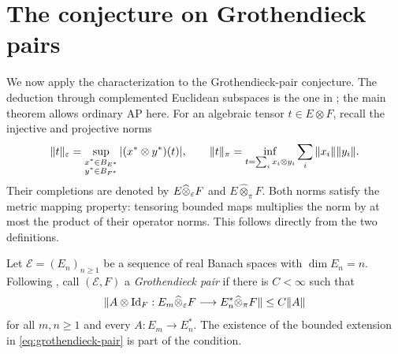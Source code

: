 \section{The conjecture on Grothendieck pairs}\label{sec:grothendieck}

We now apply the characterization to the Grothendieck-pair conjecture.
The deduction through complemented Euclidean subspaces is the one in
\cite[Corollary 4.8]{GMR25}; the main theorem allows ordinary AP here.
For an algebraic tensor \(t\in E\otimes F\), recall the injective
and projective norms
\[
\|t\|_\varepsilon
=\sup_{\substack{x^*\in B_{E^*}\\y^*\in B_{F^*}}}
  |(x^*\otimes y^*)(t)|,\qquad
\|t\|_\pi
=\inf_{t=\sum_i x_i\otimes y_i}\sum_i\|x_i\|\|y_i\|.
\]
Their completions are denoted by
\(E\widehat\otimes_\varepsilon F\) and \(E\widehat\otimes_\pi F\).
Both norms satisfy the metric mapping property:
tensoring bounded maps multiplies the norm by at most the product
of their operator norms. This follows directly from the two
definitions.

Let \(\mathcal E=(E_n)_{n\ge1}\) be a sequence of real Banach spaces
with \(\dim E_n=n\).
Following \cite[Definition 1.2]{GMR25}, call \((\mathcal E,F)\)
a \emph{Grothendieck pair} if there is \(C<\infty\) such that
\begin{equation}\label{eq:grothendieck-pair}
\|A\otimes\mathrm{Id}_F:
E_m\widehat\otimes_\varepsilon F
\longrightarrow E_n^*\widehat\otimes_\pi F\|
\le C\|A\|
\end{equation}
for all \(m,n\ge1\) and every \(A:E_m\to E_n^*\).
The existence of the bounded extension in
\eqref{eq:grothendieck-pair} is part of the condition.

